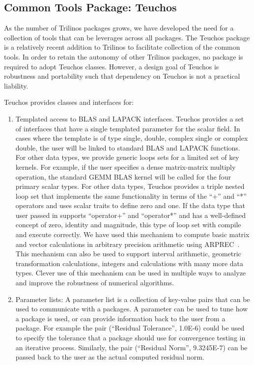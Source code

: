 \documentclass[acmtoms,acmnow]{acmtrans2m}
\begin{document}
\subsection{Common Tools Package: Teuchos}

As the number of Trilinos packages grows, we have developed the need
for a collection of tools that can be leverages across all
packages.  The Teuchos package is a relatively recent addition to
Trilinos to facilitate collection of the common tools.  In order to
retain the autonomy of other Trilinos packages, no package is required
to adopt Teuchos classes.  However, a design goal of
Teuchos is robustness and portability such that dependency on Teuchos
is not a practical liability.

Teuchos provides classes and interfaces for:
\begin{enumerate}
\item Templated access to BLAS and LAPACK interfaces.  Teuchos
provides a set of interfaces that
have a single templated parameter for the scalar field.  In cases
where the template is of type single, double, complex single or
complex double, the user will be linked to standard BLAS and LAPACK
functions.  For other data types, we provide generic loops sets for a
limited set of key kernels.  For example, if the user specifies a
dense matrix-matrix multiply operation, the standard GEMM BLAS kernel
will be called for the four primary scalar types.  For other data
types, Teuchos provides a triple nested loop set that implements the
same functionality in terms of the ``+'' and ``*'' operators and uses
scalar traits to define zero and one.  If the
data type that user passed in supports ``operator+'' and ``operator*''
and has a well-defined concept of zero, identity and magnitude,
this type of loop set with compile and execute correctly.  We have used this
mechanism to compute basic matrix and vector calculations in
arbitrary precision arithmetic using ARPREC~\cite{ARPREC}.  
This mechanism can also be used to support interval
arithmetic, geometric transformation calculations, integers and
calculations with many more data types.  Clever use of this mechanism can be
used in multiple ways to analyze and improve the robustness of numerical algorithms.
\item Parameter lists:  A parameter list is a collection of key-value
pairs that can be used to communicate with a packages.  A parameter
can be used to tune how a package is used, or can provide information
back to the user from a package.  For example the pair (``Residual Tolerance'',
1.0E-6) could be used to specify the tolerance that a package should
use for convergence testing in an iterative process.  Similarly, the
pair (``Residual Norm'', 9.3245E-7) can be passed back to the user as
the actual computed residual norm.  


\end{enumerate}
\end{document}

